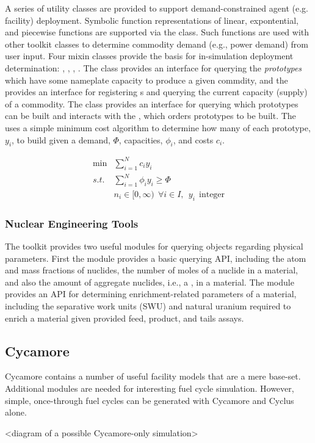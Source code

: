 A series of utility classes are provided to support demand-constrained agent
(e.g. facility) deployment. Symbolic function representations of linear,
expontential, and piecewise functions are supported via the
 class. Such functions are used with other toolkit
classes to determine commodity demand (e.g., power demand) from user input. Four
mixin classes provide the basis for in-simulation deployment determination:
, , ,
. The  class provides an
interface for querying the \textit{prototypes} which have some nameplate
capacity to produce a given commdity, and the 
provides an interface for registering s and querying
the current capacity (supply) of a commodity. The  class provides
an interface for querying which prototypes can be built and interacts with the
, which orders prototypes to be built. The
 uses a simple minimum cost algorithm to determine how
many of each prototype, $y_i$, to build given a demand, $\Phi$, capacities,
$\phi_i$, and costs $c_i$.

\begin{equation}
\begin{aligned}
 \min & \sum_{i=1}^{N}c_i y_i \\
 s.t. & \sum_{i=1}^{N}\phi_i y_i \ge \Phi \\
      & n_i \in [0,\infty) \:\: \forall i \in I, \:\: y_i \:\: \text{integer} 
\end{aligned}
\end{equation}

\subsubsection{Nuclear Engineering Tools}

The \Cyclus toolkit provides two useful modules for querying 
objects regarding physical parameters. First the  module
provides a basic querying API, including the atom and mass fractions of
nuclides, the number of moles of a nuclide in a material, and also the amount of
aggregate nuclides, i.e., a , in a material. The
 module provides an API for determining enrichment-related
parameters of a material, including the separative work units (SWU) and natural
uranium required to enrich a material given provided feed, product, and tails
assays.

\subsection{Cycamore}

Cycamore contains a number of useful facility models that are a mere base-set.
Additional modules are needed for interesting fuel cycle simulation. However,
simple, once-through fuel cycles can be generated with Cycamore and Cyclus alone.

<diagram of a possible Cycamore-only simulation>
